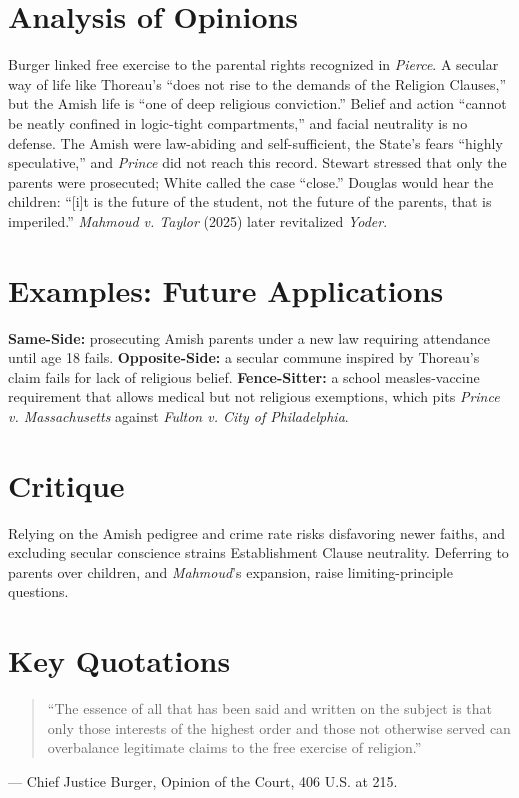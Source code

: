 \documentclass[12pt]{article}
\begin{document}
\section{Analysis of Opinions}
Burger linked free exercise to the parental rights recognized in \textit{Pierce}. A secular way of life like Thoreau's ``does not rise to the demands of the Religion Clauses,'' but the Amish life is ``one of deep religious conviction.'' Belief and action ``cannot be neatly confined in logic-tight compartments,'' and facial neutrality is no defense. The Amish were law-abiding and self-sufficient, the State's fears ``highly speculative,'' and \textit{Prince} did not reach this record. Stewart stressed that only the parents were prosecuted; White called the case ``close.'' Douglas would hear the children: ``[i]t is the future of the student, not the future of the parents, that is imperiled.'' \textit{Mahmoud v. Taylor} (2025) later revitalized \textit{Yoder}.

\section{Examples: Future Applications}
\textbf{Same-Side:} prosecuting Amish parents under a new law requiring attendance until age 18 fails. \textbf{Opposite-Side:} a secular commune inspired by Thoreau's claim fails for lack of religious belief. \textbf{Fence-Sitter:} a school measles-vaccine requirement that allows medical but not religious exemptions, which pits \textit{Prince v. Massachusetts} against \textit{Fulton v. City of Philadelphia}.

\section{Critique}
Relying on the Amish pedigree and crime rate risks disfavoring newer faiths, and excluding secular conscience strains Establishment Clause neutrality. Deferring to parents over children, and \textit{Mahmoud}'s expansion, raise limiting-principle questions.

\section{Key Quotations}
\begin{quote}
``The essence of all that has been said and written on the subject is that only those interests of the highest order and those not otherwise served can overbalance legitimate claims to the free exercise of religion.''
\end{quote}
\noindent --- Chief Justice Burger, Opinion of the Court, 406 U.S. at 215.
\end{document}
